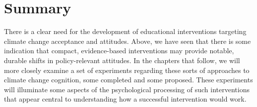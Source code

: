 \section{Summary}

There is a clear need for the development of educational interventions targeting
climate change acceptance and attitudes. Above, we have seen that there is some
indication that compact, evidence-based interventions may provide notable,
durable shifts in policy-relevant attitudes. In the chapters that follow, we
will more closely examine a set of experiments regarding these sorts of
approaches to climate change cognition, some completed and some proposed. These
experiments will illuminate some aspects of the psychological processing of such
interventions that appear central to understanding how a successful intervention
would work.



